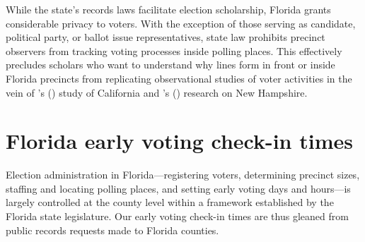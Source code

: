 \documentclass[12pt,titlepage]{article}
\newcommand{\possessivecite}[1]{\citeauthor{#1}'s (\citeyear{#1})}
\begin{document}





While the state's records laws facilitate election scholarship,
Florida grants considerable privacy to voters.  With the exception of
those serving as candidate, political party, or ballot issue
representatives, state law prohibits precinct observers from tracking
voting processes inside polling places. This effectively precludes
scholars who want to understand why lines form in front or inside
Florida precincts from replicating observational studies of voter
activities in the vein of \possessivecite{spencermarkovits:renege}
study of California and \possessivecite{herronsmith:hanoverstudy}
research on New Hampshire.

\section*{Florida early voting check-in times}

Election administration in Florida---registering voters, determining
precinct sizes, staffing and locating polling places, and setting
early voting days and hours---is largely controlled at the county
level within a framework established by the Florida state
legislature. Our early voting check-in times are thus gleaned from
public records requests made to Florida counties.

\end{document}
